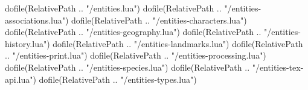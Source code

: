 
\begin{luacode*}
	dofile(RelativePath .. "/entities.lua")
	dofile(RelativePath .. "/entities-associations.lua")
	dofile(RelativePath .. "/entities-characters.lua")
	dofile(RelativePath .. "/entities-geography.lua")
	dofile(RelativePath .. "/entities-history.lua")
	dofile(RelativePath .. "/entities-landmarks.lua")
	dofile(RelativePath .. "/entities-print.lua")
	dofile(RelativePath .. "/entities-processing.lua")
	dofile(RelativePath .. "/entities-species.lua")
	dofile(RelativePath .. "/entities-tex-api.lua")
	dofile(RelativePath .. "/entities-types.lua")
\end{luacode*}

\newcommand{\setDefaultLocation}[1]{
	\directlua{DefaultLocation = "#1"}
}

\newcommand{\resetCurrentLabels}{
	\setDefaultLocation{}
	\directlua{
		LogError("Use of deprecated function resetCurrentLabels.")
	}
}

\newcommand{\newEntity}[4]{
	\directlua{
		NewEntity("#1","#2", [[\detokenize{#3}]], [[\detokenize{#4}]])
	}
}

\newcommand{\newPlace}[3]{
	\newEntity{#1}{places}{#2}{#3}
}

\newcommand{\declarePC}[1]{
	\directlua{DeclarePC("#1")}
}

\newcommand{\newNPC}[3]{
	\directlua{
		NewCharacter("#1", [[\detokenize{#2}]], [[\detokenize{#3}]])
	}
}

\newcommand{\newGod}[3]{
	\newEntity{#1}{gods}{#2}{#3}
	\setSpecies{gott}
}

\newcommand{\charappearance}[3]{
	\addDescriptor[Körper:]{Erscheinung}{#1}
	\addDescriptor[Kleidung und Ausrüstung:]{Erscheinung}{#2}
	\addDescriptor[Stimme / Verhalten:]{Erscheinung}{#3}
}

\newcommand{\newOrganisation}[3]{
	\newEntity{#1}{organisations}{#2}{#3}
}

\newcommand{\newFamily}[3]{
	\newEntity{#1}{families}{#2}{#3}
}

\newcommand{\newShip}[3]{
	\newEntity{#1}{ships}{#2}{#3}
}

\newcommand{\newSpecies}[3]{
	\newEntity{#1}{species}{#2}{#3}
}

\newcommand{\newLanguage}[3]{
	\newEntity{#1}{languages}{#2}{#3}
}

\newcommand{\newClass}[2]{
	\newEntity{#1}{classes}{}{#2}
}

\newcommand{\newSubclass}[2]{
	\newEntity{#1}{subclasses}{}{#2}
}

\newcommand{\newSpell}[2]{
	\newEntity{#1}{spells}{}{#2}
}

